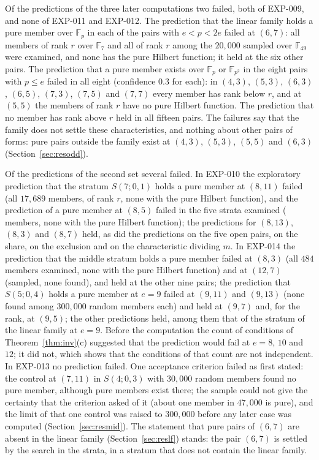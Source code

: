 \documentclass[11pt]{article}
\theoremstyle{definition}
\theoremstyle{remark}
\newcommand{\EXP}[1]{\mbox{EXP-#1}}
\newcommand{\F}{\mathbb{F}}
\begin{document}
Of the predictions of the three later computations two failed, both of \EXP{009}, and none of \EXP{011} and \EXP{012}. The prediction that the linear family holds a pure member over $\F_p$ in each of the pairs with $e<p<2e$ failed at $(6,7)$: all \nlfSixSevenRankR{} members of rank $r$ over $\F_7$ and all \nlfYSixSevenRankR{} of rank $r$ among the $20{,}000$ sampled over $\F_{49}$ were examined, and none has the pure Hilbert function; it held at the six other pairs. The prediction that a pure member exists over $\F_p$ or $\F_{p^2}$ in the eight pairs with $p\le e$ failed in all eight (confidence $0.3$ for each): in $(4,3)$, $(5,3)$, $(6,3)$, $(6,5)$, $(7,3)$, $(7,5)$ and $(7,7)$ every member has rank below $r$, and at $(5,5)$ the \nlfFiveFiveRankR{} members of rank $r$ have no pure Hilbert function. The prediction that no member has rank above $r$ held in all fifteen pairs. The failures say that the family does not settle these characteristics, and nothing about other pairs of forms: pure pairs outside the family exist at $(4,3)$, $(5,3)$, $(5,5)$ and $(6,3)$ (Section~\ref{sec:resodd}).

Of the predictions of the second set several failed. In \EXP{010} the exploratory prediction that the stratum $S(7;0,1)$ holds a pure member at $(8,11)$ failed (all $17{,}689$ members, \nwcEEightElevenRankR{} of rank $r$, none with the pure Hilbert function), and the prediction of a pure member at $(8,5)$ failed in the five strata examined (\nwcEEightFiveExamined{} members, none with the pure Hilbert function); the predictions for $(8,13)$, $(8,3)$ and $(8,7)$ held, as did the predictions on the five open pairs, on the share, on the exclusion and on the characteristic dividing $m$. In \EXP{014} the prediction that the middle stratum holds a pure member failed at $(8,3)$ (all $484$ members examined, none with the pure Hilbert function) and at $(12,7)$ (sampled, none found), and held at the other nine pairs; the prediction that $S(5;0,4)$ holds a pure member at $e=9$ failed at $(9,11)$ and $(9,13)$ (none found among $300{,}000$ random members each) and held at $(9,7)$ and, for the rank, at $(9,5)$; the other predictions held, among them that of the stratum of the linear family at $e=9$. Before the computation the count of conditions of Theorem~\ref{thm:inv}(c) suggested that the prediction would fail at $e=8$, $10$ and $12$; it did not, which shows that the conditions of that count are not independent. In \EXP{013} no prediction failed. One acceptance criterion failed as first stated: the control at $(7,11)$ in $S(4;0,3)$ with $30{,}000$ random members found no pure member, although pure members exist there; the sample could not give the certainty that the criterion asked of it (about one member in $47{,}000$ is pure), and the limit of that one control was raised to $300{,}000$ before any later case was computed (Section~\ref{sec:resmid}). The statement that pure pairs of $(6,7)$ are absent in the linear family (Section~\ref{sec:reslf}) stands: the pair $(6,7)$ is settled by the search in the strata, in a stratum that does not contain the linear family.
\end{document}
